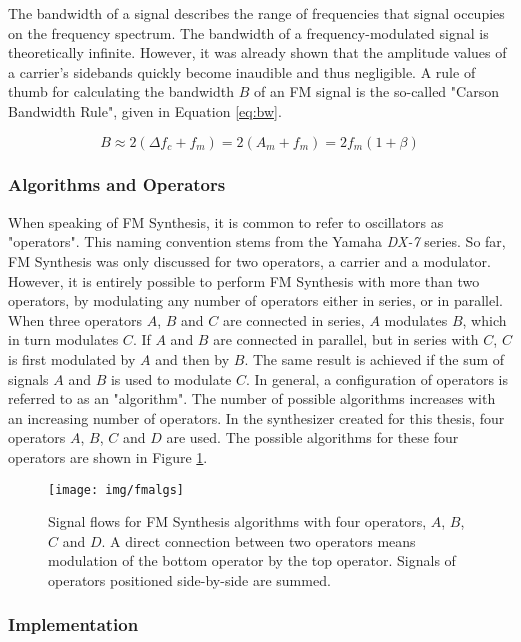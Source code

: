   The bandwidth of a signal describes the range of frequencies that signal occupies on the frequency spectrum. The bandwidth of a frequency-modulated signal is theoretically infinite. However, it was already shown that the amplitude values of a carrier's sidebands quickly become inaudible and thus negligible. A rule of thumb for calculating the bandwidth $B$ of an FM signal is the so-called "Carson Bandwidth Rule", given in Equation \ref{eq:bw}.

  \begin{equation}
    B \approx 2(\Delta f_{c} + f_{m}) = 2(A_{m} + f_{m}) = 2f_{m}(1 + \beta)
    \label{eq:bw}
  \end{equation}

  \subsubsection{Algorithms and Operators}

  When speaking of FM Synthesis, it is common to refer to oscillators as "operators". This naming convention stems from the Yamaha \emph{DX-7} series. So far, FM Synthesis was only discussed for two operators, a carrier and a modulator. However, it is entirely possible to perform FM Synthesis with more than two operators, by modulating any number of operators either in series, or in parallel. When three operators $A$, $B$ and $C$ are connected in series, $A$ modulates $B$, which in turn modulates $C$. If $A$ and $B$ are connected in parallel, but in series with $C$, $C$ is first modulated by $A$ and then by $B$. The same result is achieved if the sum of signals $A$ and $B$ is used to modulate $C$. In general, a configuration of operators is referred to as an "algorithm". The number of possible algorithms increases with an increasing number of operators. In the synthesizer created for this thesis, four operators $A$, $B$, $C$ and $D$ are used. The possible algorithms for these four operators are shown in Figure \ref{fig:fmalgs}.

  \begin{figure}[p!]
    \texttt{[image: img/fmalgs]}
    \caption{Signal flows for FM Synthesis algorithms with four operators, $A$, $B$, $C$ and $D$. A direct connection between two operators means modulation of the bottom operator by the top operator. Signals of operators positioned side-by-side are summed.}
    \label{fig:fmalgs}
  \end{figure}

  \subsubsection{Implementation}

